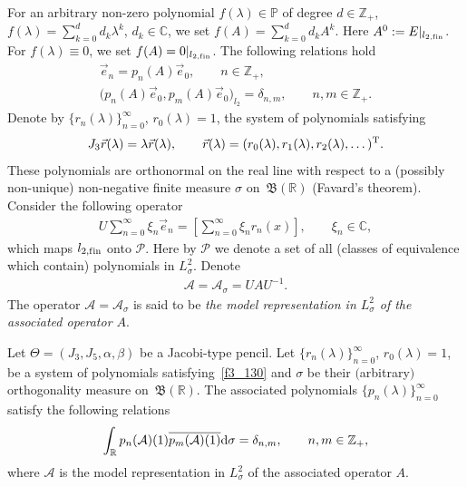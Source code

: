 For an arbitrary non-zero polynomial $f(\lambda)\in\mathbb{P}$ of degree $d\in\mathbb{Z}_+$, $f(\lambda) = \sum\limits_{k=0}^d d_k \lambda^k$, $d_k\in\mathbb{C}$, we set $f(A) = \sum\limits_{k=0}^d d_k A^k$. Here $A^0 := E|_{l_{2,{\rm f\/in}}}$. For $f(\lambda) \equiv 0$, we set $f(A) = 0|_{l_{2,{\rm f\/in}}}$. The following relations hold~\cite{cit_95000_Z}
\begin{gather}\label{f3_110}
\vec e_n = p_n(A) \vec e_0,\qquad n\in\mathbb{Z}_+,\\
\label{f3_120} \big( p_n(A) \vec e_0, p_m(A) \vec e_0 \big)_{l_2} = \delta_{n,m},\qquad n,m\in\mathbb{Z}_+.
\end{gather}
Denote by $\{ r_n(\lambda) \}_{n=0}^\infty$, $r_0(\lambda) = 1$, the system of polynomials satisfying
\begin{gather}
\label{f3_130}
J_3 \vec r(\lambda) = \lambda \vec r(\lambda),\qquad \vec r(\lambda) = (r_0(\lambda), r_1(\lambda),r_2(\lambda), \dots )^{\rm T}.
\end{gather}
These polynomials are orthonormal on the real line with respect to a (possibly non-unique) non-negative f\/inite measure $\sigma$ on~$\mathfrak{B}(\mathbb{R})$ (Favard's theorem). Consider the following operator
\begin{gather}\label{f3_140}
U \sum_{n=0}^\infty \xi_n \vec e_n = \left[ \sum_{n=0}^\infty \xi_n r_n(x) \right ],\qquad \xi_n\in\mathbb{C},
\end{gather}
which maps $l_{2,{\rm f\/in}}$ onto $\mathcal{P}$. Here by $\mathcal{P}$ we denote a set of all (classes of equivalence which contain) polynomials in $L^2_\sigma$. Denote
\begin{gather} \label{f3_150}
\mathcal{A} = \mathcal{A}_\sigma = U A U^{-1}.
\end{gather}
The operator $\mathcal{A} = \mathcal{A}_\sigma$ is said to be \textit{the model representation in $L^2_\sigma$ of the associated operator $A$}.

\begin{Theorem}\label{t3_1} Let $\Theta = (J_3, J_5, \alpha, \beta)$ be a Jacobi-type pencil. Let $\{ r_n(\lambda) \}_{n=0}^\infty$, $r_0(\lambda) = 1$, be a system of polynomials satisfying~\eqref{f3_130} and $\sigma$ be their $($arbitrary$)$ orthogonality measure on~$\mathfrak{B}(\mathbb{R})$. The associated polynomials $\{ p_n(\lambda) \}_{n=0}^\infty$ satisfy the following relations
\begin{gather}\label{f3_160}
\int_{\mathbb{R}} p_n(\mathcal{A})(1) \overline{ p_m(\mathcal{A})(1) } {\rm d}\sigma = \delta_{n,m},\qquad n,m\in\mathbb{Z}_+,
\end{gather}
where $\mathcal{A}$ is the model representation in $L^2_\sigma$ of the associated operator $A$.
\end{Theorem}

